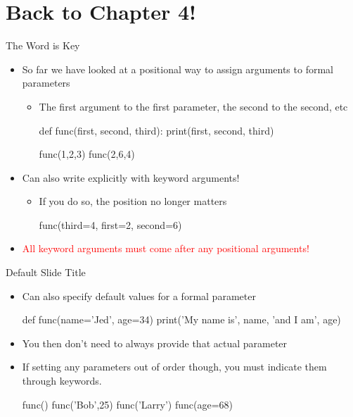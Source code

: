 \documentclass[pdf, aspectratio=169, 12pt]{beamer}
\begin{document}
\section{Back to Chapter 4!}

\begin{frame}[fragile]{The Word is Key}
	\vspace{5mm}
	\begin{itemize}[<+->]
		\item So far we have looked at a positional way to assign arguments to formal parameters
			\begin{itemize}
				\item The first argument to the first parameter, the second to the second, etc
					\begin{center}
						\begin{pythoncode}
							def func(first, second, third):
								print(first, second, third)

							func(1,2,3)
							func(2,6,4)
						\end{pythoncode}
					\end{center}
			\end{itemize}
		\item Can also write explicitly with keyword arguments!
			\begin{itemize}
				\item If you do so, the position no longer matters
					\begin{center}
						\begin{pythoncode}
							func(third=4, first=2, second=6)
						\end{pythoncode}
					\end{center}
			\end{itemize}
		\item \textcolor{Red}{All keyword arguments must come after any positional arguments!}
	\end{itemize}
\end{frame}

\begin{frame}[fragile]{Default Slide Title}
	\begin{itemize}[<+->]
		\item Can also specify default values for a formal parameter
			\begin{pythoncode}
				def func(name='Jed', age=34)
					print('My name is', name, 'and I am', age)
			\end{pythoncode}
		\item You then don't need to always provide that actual parameter
		\item If setting any parameters out of order though, you \alert{must} indicate them through keywords.
			\begin{pythoncode}
				func()
				func('Bob',25)
				func('Larry')
				func(age=68)
			\end{pythoncode}
	\end{itemize}
\end{frame}
\end{document}
